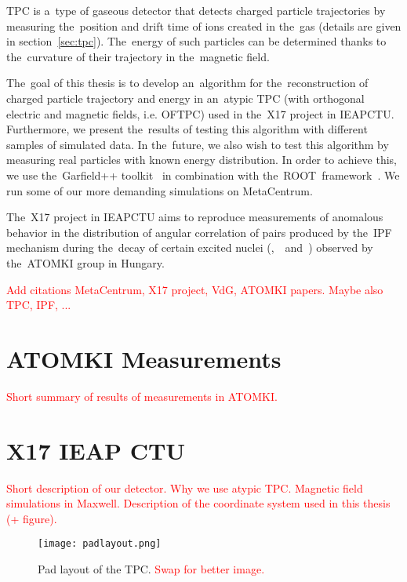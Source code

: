 	\ac{TPC} is a~type of gaseous detector that detects charged particle trajectories by measuring the~position and drift time of ions created in the~gas (details are given in section~\ref{sec:tpc}). The~energy of such particles can be determined thanks to the~curvature of their trajectory in the~magnetic field.
	
	The~goal of this thesis is to develop an~algorithm for the~reconstruction of charged particle trajectory and energy in an~atypic \ac{TPC} (with orthogonal electric and magnetic fields, i.e. \ac{OFTPC}) used in the~X17 project in \ac{IEAPCTU}. Furthermore, we present the~results of testing this algorithm with different samples of simulated data. In the~future, we also wish to test this algorithm by measuring real particles with known energy distribution. In order to achieve this, we use the~Garfield++ toolkit~\cite{Garfield++} in combination with the~ROOT~framework~\cite{ROOT}. We run some of our more demanding simulations on MetaCentrum.
	
	The~X17 project in \ac{IEAPCTU} aims to reproduce measurements of anomalous behavior in the distribution of angular correlation of pairs produced by the~\ac{IPF} mechanism during the~decay of certain excited nuclei (,~~and~) observed by the~ATOMKI group in Hungary. 
	
	\textcolor{red}{Add citations MetaCentrum, X17 project, VdG, ATOMKI papers. Maybe also TPC, IPF, ...}
	
	\section{ATOMKI Measurements}
	\textcolor{red}{Short summary of results of measurements in ATOMKI.}
	
	\section{X17 IEAP CTU}
	\label{sec:IEAP}
	\textcolor{red}{Short description of our detector. Why we use atypic TPC. Magnetic field simulations in Maxwell. Description of the coordinate system used in this thesis (+ figure).}
	
	\begin{figure}
		\centering
		\texttt{[image: padlayout.png]}
		\caption{Pad layout of the TPC. \textcolor{red}{Swap for better image.}}
		\label{fig:padlayout}
	\end{figure}